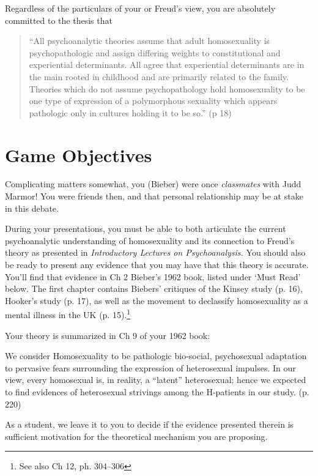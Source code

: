 \begin{refsection}
Regardless of the particulars of your or Freud's view, you are absolutely committed to the thesis that

\begin{quote}

``All psychoanalytic theories assume that adult homosexuality is psychopathologic and assign differing weights to constitutional and experiential determinants. All agree that experiential determinants are in the main rooted in childhood and are primarily related to the family. Theories which do not assume psychopathology hold homosexuality to be one type of expression of a polymorphous sexuality which appears pathologic only in cultures holding it to be so.'' (p 18)
\end{quote}

\section{Game Objectives}
\label{gameobjectives}

Complicating matters somewhat, you (Bieber) were once \emph{classmates} with Judd Marmor! You were friends then, and that personal relationship may be at stake in this debate.

During your presentations, you must be able to both articulate the current psychoanalytic understanding of homosexuality and its connection to Freud's theory as presented in \emph{Introductory Lectures on Psychoanalysis.} You should also be ready to present any evidence that you may have that this theory is accurate. You'll find that evidence in Ch 2 Bieber's 1962 book, listed under `Must Read' below. The first chapter contains Biebers' critiques of the Kinsey study (p. 16), Hooker's study (p. 17), as well as the movement to declassify homosexuality as a mental illness in the UK (p. 15).\footnote{See also Ch 12, ph. 304--306}

Your theory is summarized in Ch 9 of your 1962 book:

We consider Homosexuality to be pathologic bio-social, psychosexual adaptation to pervasive fears surrounding the expression of heterosexual impulses. In our view, every homosexual is, in reality, a ``latent'' heterosexual; hence we expected to find evidences of heterosexual strivings among the H-patients in our study. (p. 220)

As a student, we leave it to you to decide if the evidence presented therein is sufficient motivation for the theoretical mechanism you are proposing.


\end{refsection}
